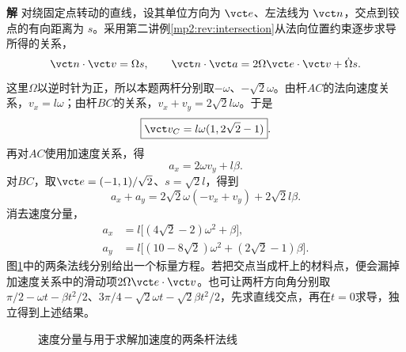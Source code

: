 \documentclass[11pt,openany,fontset=fandol]{ctexbook}
\theoremstyle{definition}\newtheorem{example}{例}[chapter]\newtheorem{exercise}{习题}[chapter]
\newcommand{\SolutionStart}{\par\medskip\ifdim\pagetotal>0pt\ifdim\dimexpr\pagegoal-\pagetotal\relax<3\baselineskip\newpage\fi\fi\noindent\textbf{解}\quad\ignorespaces}
\newenvironment{solution}{\SolutionStart}{\par\medskip}
\begin{document}
\begin{solution}
对绕固定点转动的直线，设其单位方向为 $\vct e$、左法线为 $\vct n$，交点到铰点的有向距离为 $s$。采用第二讲例\ref{mp2:rev:intersection}从法向位置约束逐步求导所得的关系，
\[
 \vct n\cdot\vct v=\Omega s,\qquad
 \vct n\cdot\vct a=2\Omega\vct e\cdot\vct v+\dot\Omega s.
\]
这里$\Omega$以逆时针为正，所以本题两杆分别取$-\omega$、$-\sqrt2\omega$。由杆$AC$的法向速度关系，$v_x=l\omega$；由杆$BC$的关系，$v_x+v_y=2\sqrt2l\omega$。于是
\[
 \boxed{\vct v_C=l\omega(1,2\sqrt2-1)}.
\]
再对$AC$使用加速度关系，得
\[
 a_x=2\omega v_y+l\beta.
\]
对$BC$，取$\vct e=(-1,1)/\sqrt2$、$s=\sqrt2l$，得到
\[
 a_x+a_y=2\sqrt2\omega(-v_x+v_y)+2\sqrt2l\beta.
\]
消去速度分量，
\[
 \boxed{\begin{aligned}
 a_x&=l\big[(4\sqrt2-2)\omega^2+\beta\big],\\
 a_y&=l\big[(10-8\sqrt2)\omega^2+(2\sqrt2-1)\beta\big].
 \end{aligned}}
\]
图\ref{mp3:fig:hw:l3-19-s}中的两条法线分别给出一个标量方程。若把交点当成杆上的材料点，便会漏掉加速度关系中的滑动项$2\Omega\vct e\cdot\vct v$。也可让两杆方向角分别取$\pi/2-\omega t-\beta t^2/2$、$3\pi/4-\sqrt2\omega t-\sqrt2\beta t^2/2$，先求直线交点，再在$t=0$求导，独立得到上述结果。


\begin{figure}[H]\centering
{}
\caption{速度分量与用于求解加速度的两条杆法线}\label{mp3:fig:hw:l3-19-s}
\end{figure}

\end{solution}
\end{document}
